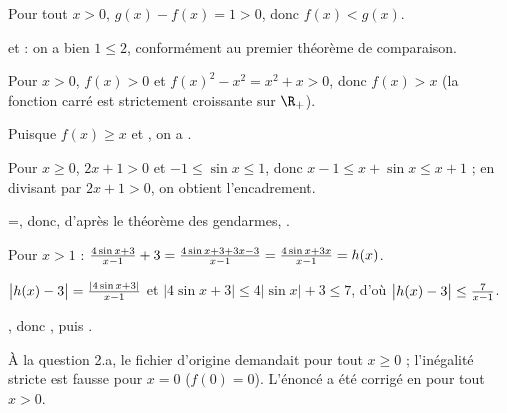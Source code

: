 \begin{corrigeprof}[16]
\be
\item \be \item Pour tout $x>0$, $g(x)-f(x)=1>0$, donc $f(x)<g(x)$.
	\item {} et  : on a bien $1\leq 2$, conformément au premier théorème de comparaison.\ee
\item \be \item Pour $x>0$, $f(x)>0$ et $f(x)^2-x^2=x^2+x>0$, donc $f(x)>x$ (la fonction carré est strictement croissante sur $\R_+$).
	\item Puisque $f(x)\geq x$ et , on a .\ee
\item \be \item Pour $x\geq 0$, $2x+1>0$ et $-1\leq \sin x\leq 1$, donc $x-1\leq x+\sin x\leq x+1$ ; en divisant par $2x+1>0$, on obtient l'encadrement.
	\item {}=, donc, d'après le théorème des gendarmes, .\ee
\item \be \item Pour $x>1$ : $\frac{4\sin x+3}{x-1}+3=\frac{4\sin x+3+3x-3}{x-1}=\frac{4\sin x+3x}{x-1}=h(x)$.
	\item $\big\lvert h(x)-3\big\rvert=\frac{\lvert 4\sin x+3\rvert}{x-1}$ et $\lvert 4\sin x+3\rvert\leq 4\lvert\sin x\rvert+3\leq 7$, d'où $\big\lvert h(x)-3\big\rvert\leq\frac{7}{x-1}$.
	\item {}, donc , puis .\ee
\ee
\end{corrigeprof}
\begin{noteprof}
À la question 2.a, le fichier d'origine demandait \og pour tout $x\geq 0$\fg{} ; l'inégalité stricte est fausse pour $x=0$ ($f(0)=0$). L'énoncé a été corrigé en \og pour tout $x>0$\fg{}.
\end{noteprof}
